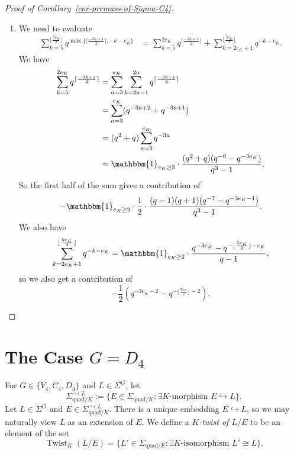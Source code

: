 \documentclass[11pt]{amsart}
\theoremstyle{theorem}
\theoremstyle{example}
\theoremstyle{definition}
\numberwithin{theorem}{section}
\numberwithin{theorem}{section}
\DeclareMathOperator{\Twist}{Twist}
\newcommand{\quadr}{\mathrm{quad}}
\begin{document}
\begin{proof}[Proof of Corollary~\ref{cor-premass-of-Sigma-C4}]
\begin{enumerate}
\begin{enumerate}
$$            \Big).
            $$
            \item We need to evaluate 
            \begin{align*}
            \sum_{k=5}^{\lfloor \frac{5e_K}{2}\rfloor} q^{\max\{
                \lceil \frac{-3k+1}{2}\rceil, -k - e_K    
            \}} &= \sum_{k=5}^{2e_K}q^{\lceil \frac{-3k+1}{2}\rceil} + \sum_{k=2e_K + 1}^{\lfloor\frac{5e_K}{2}\rfloor} q^{-k-e_K}.
            \end{align*}
            We have 
            \begin{align*}
            \sum_{k=5}^{2e_K} q^{\lceil  \frac{-3k+1}{2}\rceil} &= \sum_{a=3}^{e_K}\sum_{k=2a-1}^{2a}q^{\lceil \frac{-3k+1}{2}\rceil} 
            \\
            &= \sum_{a=3}^{e_K}(q^{-3a + 2} + q^{-3a+1})
            \\
            &= (q^2+q)\sum_{a=3}^{e_K}q^{-3a}
            \\
            &= \mathbbm{1}_{e_K \geq 3}\cdot \frac{(q^2+q)(q^{-6} - q^{-3e_K})}{q^3-1}. 
            \end{align*}
            So the first half of the sum gives a contribution of 
            $$
            -\mathbbm{1}_{e_K \geq 2}\cdot \frac{1}{2}\cdot\frac{(q-1)(q+1)(q^{-7} - q^{-3e_K - 1})}{q^3-1}.
            $$
            We also have 
            $$
            \sum_{k=2e_K+1}^{\lfloor\frac{5e_K}{2}\rfloor} q^{-k-e_K} = \mathbbm{1}_{e_K\geq 2}\cdot \frac{q^{-3e_K} - q^{-\lfloor\frac{5e_K}{2}\rfloor - e_K}}{q-1},
            $$
            so we also get a contribution of 
            $$
            - \frac{1}{2}(q^{-3e_K - 2} - q^{-\lfloor\frac{7e_K}{2}\rfloor - 2}).
            $$
        \end{enumerate}
    \end{enumerate}
\end{proof}
\section{The Case $G = D_4$}
\label{sec-G=D4}



For $G \in \{V_4, C_4, D_4\}$ and $L \in \Sigma^G$, let 
$$
\Sigma_{\quadr/K}^{\hookrightarrow L} := \{E \in \Sigma_{\quadr/K} : \exists K\text{-morphism } E \hookrightarrow L\}.
$$
Let $L \in \Sigma^G$ and $E \in \Sigma_{\quadr/K}^{\hookrightarrow L}$. There is a unique embedding $E \hookrightarrow L$, so we may naturally view $L$ as an extension of $E$. We define a \emph{$K$-twist of $L/E$} to be an element of the set
$$
\Twist_K(L/E) = \{L' \in \Sigma_{\quadr/E} : \exists K\text{-isomorphism } L' \cong L\}.
$$
\end{document}
